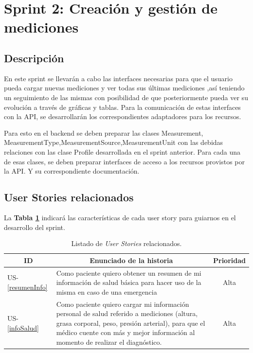 \section{Sprint 2: Creación y gestión de mediciones} %


\subsection{Descripción}
En este sprint se llevarán a cabo las interfaces necesarias para que el usuario pueda cargar nuevas mediciones y ver todas sus últimas mediciones ,así teniendo un seguimiento de las mismas con posibilidad de que posteriormente pueda ver su evolución a través de gráficas y tablas.
Para la comunicación de estas interfaces con la API, se desarrollarán los correspondientes adaptadores para los recursos.

Para esto en el backend se deben preparar las clases Measurement, MeasurementType,MeasurementSource,MeasurementUnit con las debidas relaciones con las clase Profile desarrollada en el sprint anterior.
Para cada una de esas clases, se deben preparar interfaces de acceso a los recursos provistos por la API. Y su correspondiente documentación.


\subsection{User Stories relacionados}
La \textbf{Tabla \ref{US-Sprint2}} indicará las características de cada user story para guiarnos en el desarrollo del sprint.

\begin{table}[h]
    \centering
	\begin{tabular}{|l|p{9cm}|c|}
	\hline
        \multicolumn{1}{|c|}{\textbf{ID}} &
        \multicolumn{1}{|c|}{\textbf{Enunciado de la historia}} &
        \textbf{Prioridad} \\          
    \hline
        US-\ref{resumenInfo} &
        Como paciente quiero obtener un resumen de mi información de salud básica para hacer uso de la misma en caso de una emergencia &Alta
        \\
    \hline 
	    US-\ref{infoSalud} &
        Como paciente quiero cargar mi información personal de salud referido a mediciones (altura, grasa corporal, peso, presión arterial), para que el médico cuente con más y mejor información al momento de realizar el diagnóstico. & Alta
        \\
    \hline
    \end{tabular}
    \caption{Listado de \textit{User Stories} relacionados.}
    \label{US-Sprint2}
\end{table}

